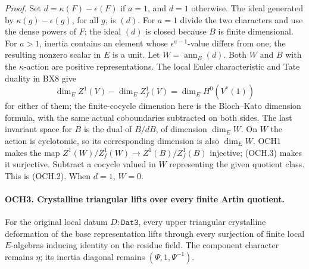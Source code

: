 \emph{Proof.}
Set \(d=\kappa(F)-\epsilon(F)\) if \(a=1\), and \(d=1\)
otherwise.  The ideal generated by
\(\kappa(g)-\epsilon(g)\), for all \(g\), is \((d)\).
For \(a=1\) divide the two characters and use the dense powers of
\(F\); the ideal \((d)\) is closed because \(B\) is finite
 dimensional.  For \(a>1\), inertia contains an element whose
\(\epsilon^{a-1}\)-value differs from one; the resulting nonzero
scalar in \(E\) is a unit.
Let \(W=\operatorname{ann}_B(d)\).  Both \(W\) and \(B\)
with the \(\kappa\)-action are positive representations.  The
local Euler characteristic and Tate duality in BX8 give
\[
 \dim_E Z^1(V)-\dim_E Z^1_f(V)
       =\dim_E H^0(V^*(1))
 \tag{OCH.3}
\]
for either of them; the finite-cocycle dimension here is the
Bloch--Kato dimension formula, with the same actual coboundaries
subtracted on both sides.  The last invariant space for \(B\)
is the dual of \(B/dB\), of dimension \(\dim_E W\).
On \(W\) the action is cyclotomic, so its corresponding dimension
is also \(\dim_E W\).  OCH1 makes the map
\(Z^1(W)/Z^1_f(W)\to Z^1(B)/Z^1_f(B)\) injective;
(OCH.3) makes it surjective.  Subtract a cocycle valued in \(W\)
representing the given quotient class.  This is (OCH.2).
When \(d=1\), \(W=0\).

\paragraph{OCH3. Crystalline triangular lifts over every finite Artin quotient.}
\label{claim:OCH3}
For the original local datum \(D:\texttt{Dat3}\), every upper
triangular crystalline deformation of the base representation lifts
through every surjection of finite local \(E\)-algebras inducing
identity on the residue field.  The component character remains
\(\eta\); its inertia diagonal remains
\((\Psi,1,\Psi^{-1})\).

